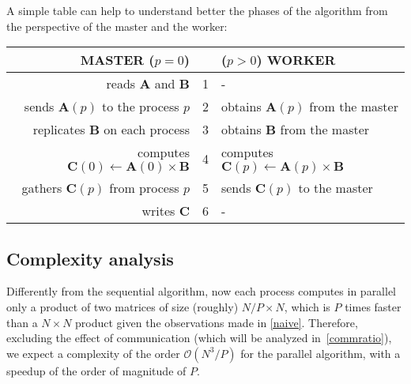 \documentclass[11pt]{article}
\begin{document}
A simple table can help to understand better the phases of the algorithm from the perspective of the master and the worker:
\begin{table}[ht]
    \label{masterSlave}
    \centering
    \begin{tabular}{r @{\hskip 0.375in} c @{\hskip 0.375in} l}
        \toprule
        MASTER ($p = 0$) & & ($p > 0$) WORKER \\
        \midrule
        reads $\mathbf{A}$ and $\mathbf{B}$ & 1 & - \\
        sends $\mathbf{A}(p)$ to the process $p$ & 2 & obtains $\mathbf{A}(p)$ from the master \\
        replicates $\mathbf{B}$ on each process & 3 & obtains $\mathbf{B}$ from the master \\ 
        computes $\mathbf{C}(0) \gets \mathbf{A}(0) \times \mathbf{B}$ & 4 & computes $\mathbf{C}(p) \gets \mathbf{A}(p) \times \mathbf{B}$ \\
        gathers $\mathbf{C}(p)$ from process $p$ & 5 & sends $\mathbf{C}(p)$ to the master \\
        writes $\mathbf{C}$ & 6 & - \\
    \bottomrule
    \end{tabular}
\end{table}

\subsection{Complexity analysis\label{complAnalysis}}
Differently from the sequential algorithm, now each process computes in parallel only a product of two matrices of size (roughly) $ N/P \times N$, which is $P$ times faster than a $N \times N$ product given the observations made in \ref{naive}. Therefore, excluding the effect of communication (which will be analyzed in~\ref{commratio}), we expect a complexity of the order $\mathcal{O}(N^3 / P)$ for the parallel algorithm, with a speedup of the order of magnitude of $P$.
\end{document}
